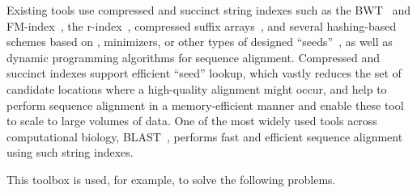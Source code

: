 \begin{itemize}[leftmargin=*]
Existing tools use compressed and succinct string indexes such as the BWT~\cite{burrows1994block} and FM-index~\cite{ferragina2000opportunistic}, the r-index~\cite{gagie2018optimal}, compressed suffix arrays~\cite{grossi2000compressed}, and several hashing-based schemes based on \kmers, minimizers, or other types of designed ``seeds''~\cite{li2018minimap2,pibiri2022sparse,sahlin2022strobealign}, as well as dynamic programming algorithms for sequence alignment.
Compressed and succinct indexes support efficient ``seed'' lookup, which vastly reduces the set of candidate locations where a high-quality alignment might occur, and help to perform sequence alignment in a memory-efficient manner and enable these tool to scale to large volumes of data.
One of the most widely used tools across computational biology, BLAST~\cite{altschul1990basic}, performs fast and efficient sequence alignment using such string indexes.
\end{itemize}

\noindent
This toolbox is used, for example, to solve the following problems.

